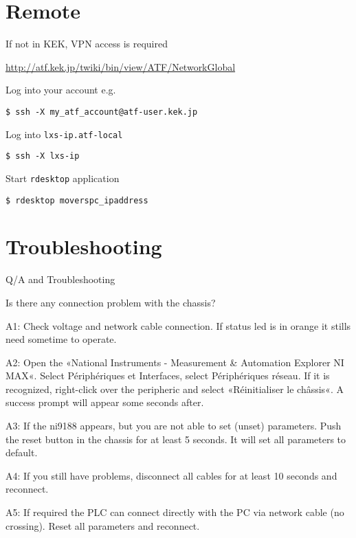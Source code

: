 \section{Remote}
If not in KEK, VPN access is required\par
\url{http://atf.kek.jp/twiki/bin/view/ATF/NetworkGlobal}\par
Log into your account e.g.\par
\verb?$ ssh -X my_atf_account@atf-user.kek.jp?\par
Log into \verb?lxs-ip.atf-local?\par
\verb?$ ssh -X lxs-ip?\par
Start \verb?rdesktop? application\par
\verb?$ rdesktop moverspc_ipaddress?

\section{Troubleshooting}
Q/A and Troubleshooting\par 
Is there any connection problem with the chassis?\par 
A1: Check voltage and network cable connection. If status led is in orange it stills need sometime to operate.\par 
A2: Open the «National Instruments - Measurement \& Automation Explorer NI MAX«. Select Périphériques et Interfaces, select Périphériques réseau. If it is recognized, right-click over the peripheric and select «Réinitialiser le châssis«. A success prompt will appear some seconds after.\par 
A3: If the ni9188 appears, but you are not able to set (unset) parameters. Push the reset button in the chassis for at least 5 seconds. It will set all parameters to default.\par 
A4: If you still have problems, disconnect all cables for at least 10 seconds and reconnect.\par 
A5: If required the PLC can connect directly with the PC via network cable (no crossing). Reset all parameters and reconnect.\par 

